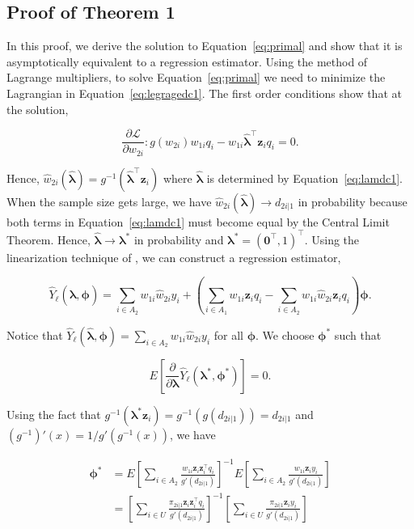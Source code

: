 \documentclass[12pt]{article}
\renewcommand{\bf}[1]{\mathbf{#1}}
\begin{document}
\subsection{Proof of Theorem 1}

In this proof, we derive the solution to Equation~\ref{eq:primal} and show
that it is asymptotically equivalent to a regression estimator. Using the
method of Lagrange multipliers, to solve Equation~\eqref{eq:primal} we need to
minimize the Lagrangian in Equation~\eqref{eq:legragedc1}. 
The first order conditions show that at the solution,

$$
\frac{\partial \mathcal{L}}{\partial w_{2i}}: g(w_{2i}) w_{1i}q_i -
w_{1i} \hat{\bm \lambda}^\top \bf z_i q_i = 0.
$$

Hence, $\hat w_{2i}(\hat{\bm \lambda}) = 
g^{-1}(\hat{\bm \lambda}^\top \bf z_i)$ where
$\hat{\bm \lambda}$ is determined by Equation~\eqref{eq:lamdc1}. When the
sample size gets large, we have $\hat w_{2i}(\hat{\bm \lambda}) \to
d_{2i|1}$ in probability because both terms in Equation~\eqref{eq:lamdc1} must
become equal by the Central Limit Theorem. Hence,
$\hat{\bm \lambda} \to \bm \lambda^*$ in probability and 
$\bm \lambda^* = (\bf 0^\top, 1)^\top$. 
Using the linearization technique of
\cite{randles1982asymptotic}, we can construct a regression estimator, 

$$
\hat Y_\ell(\hat{\bm \lambda}, \bm \phi) = 
\sum_{i \in A_2} w_{1i} \hat w_{2i} y_i + 
\left(\sum_{i \in A_1} w_{1i} \bm z_i q_i - \sum_{i \in A_2} w_{1i} 
\hat w_{2i} \bf z_i q_i\right)\bm \phi.
$$

Notice that $\hat Y_\ell(\hat{\bm \lambda}, \bm \phi) = \sum_{i \in A_2} w_{1i}
\hat w_{2i} y_i$ for all $\bm \phi$. We choose $\bm \phi^*$ such that

$$
E\left[\frac{\partial}{\partial \bm \lambda} \hat Y_\ell(\bm \lambda^*,
\bm \phi^*)\right]=0.
$$

Using the fact that $g^{-1}(\bm \lambda^* \bf z_i) = g^{-1}(g(d_{2i|1})) = d_{2i|1}$
and $(g^{-1})'(x) = 1 / g'(g^{-1}(x))$, we have

\begin{align*}
  \bm \phi^*
  &= E\left[\sum_{i \in A_2} \frac{w_{1i}\bf z_i \bf z_i^\top q_i}{g'(d_{2i|1})}
  \right]^{-1}
  E\left[\sum_{i \in A_2} \frac{w_{1i}\bf z_i y_i}{g'(d_{2i|1})}\right]\\
  &= \left[\sum_{i \in U} \frac{\pi_{2i|1} \bf z_i \bf z_i^\top q_i}{g'(d_{2i|1})}
  \right]^{-1}
  \left[\sum_{i \in U} \frac{\pi_{2i|1} \bf z_i y_i}{g'(d_{2i|1})}\right]\\
\end{align*}
\end{document}
